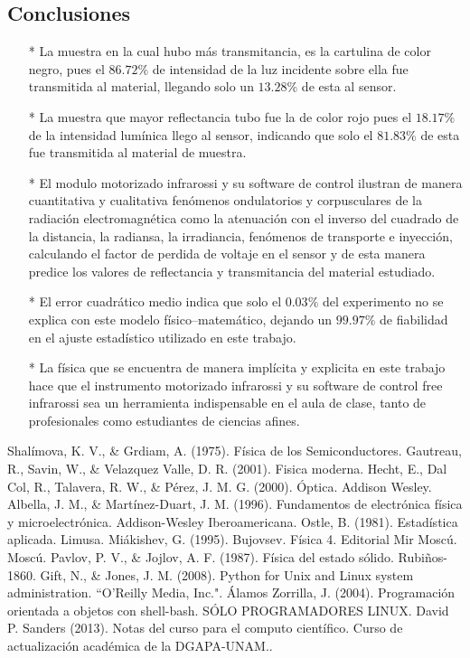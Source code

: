 \documentclass[12]{article}
\begin{document}
\begin{multicols}{2}
\section{Conclusiones}
\begin{enumerate}
\item[*]  La muestra en la cual hubo más transmitancia, es la cartulina de color negro, pues el $86.72\%$ de intensidad de la luz incidente sobre ella fue transmitida al material, llegando solo un $13.28\%$ de esta al sensor.
\item[*]  La muestra que mayor reflectancia tubo fue la de color rojo pues el $18.17\%$ de la intensidad lumínica llego al sensor, indicando que solo el $81.83\%$ de esta fue transmitida al material de muestra.
\item[*] El modulo motorizado infrarossi y su software de control ilustran de manera cuantitativa y cualitativa fenómenos ondulatorios y corpusculares  de la radiación electromagnética como la atenuación con el inverso del cuadrado de la distancia, la radiansa, la irradiancia, fenómenos de transporte e  inyección, calculando el factor de perdida de voltaje en el sensor y de esta manera predice los valores de reflectancia y transmitancia del material estudiado.  
\item[*] El error cuadrático medio indica que solo el $0.03\%$ del experimento no se explica con este modelo físico–matemático, dejando un $99.97\%$ de fiabilidad en el ajuste estadístico utilizado en este trabajo.
\item[*] La física que se encuentra de manera implícita y explicita en este trabajo hace que el instrumento motorizado infrarossi y su software de control free infrarossi sea un herramienta indispensable  en el aula de clase,  tanto de profesionales como estudiantes de ciencias afines.
\end{enumerate}
\begin{thebibliography}{99}
 Shalímova, K. V., \& Grdiam, A. (1975). Física de los Semiconductores.
 Gautreau, R., Savin, W., \& Velazquez Valle, D. R. (2001). Fisica moderna.
 Hecht, E., Dal Col, R., Talavera, R. W., \& Pérez, J. M. G. (2000). Óptica. Addison Wesley.
 Albella, J. M., \& Martínez-Duart, J. M. (1996). Fundamentos de electrónica física y microelectrónica. Addison-Wesley Iberoamericana.
 Ostle, B. (1981). Estadística aplicada. Limusa.
 Miákishev, G. (1995). Bujovsev. Física 4. Editorial Mir Moscú. Moscú. 
 Pavlov, P. V., \& Jojlov, A. F. (1987). Física del estado sólido. Rubiños-1860.
 Gift, N., \& Jones, J. M. (2008). Python for Unix and Linux system administration. ``O'Reilly Media, Inc.".
 Álamos Zorrilla, J. (2004). Programación orientada a objetos con shell-bash. SÓLO PROGRAMADORES LINUX.
 David P. Sanders (2013). Notas del curso para el computo científico. Curso de actualización académica de la DGAPA-UNAM..
\end{thebibliography}
\end{multicols}
\end{document}
